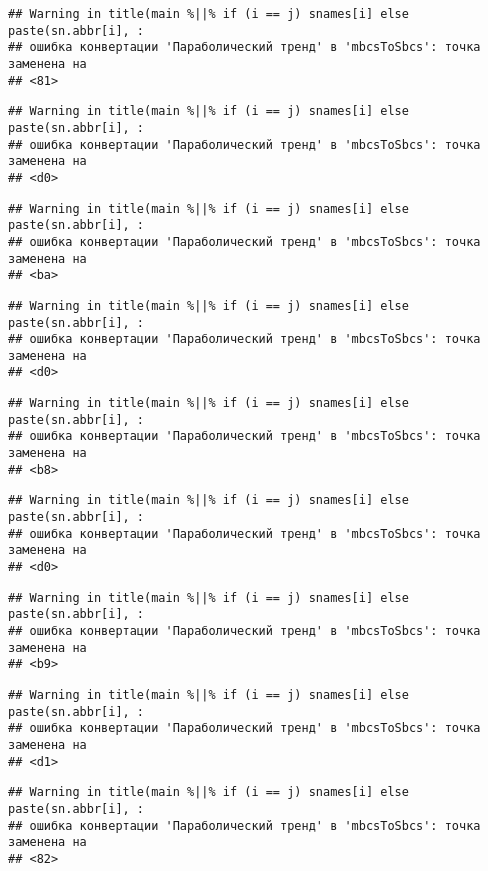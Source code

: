 \documentclass[
]{article}
\begin{document}
\begin{verbatim}
## Warning in title(main %||% if (i == j) snames[i] else paste(sn.abbr[i], :
## ошибка конвертации 'Параболический тренд' в 'mbcsToSbcs': точка заменена на
## <81>
\end{verbatim}

\begin{verbatim}
## Warning in title(main %||% if (i == j) snames[i] else paste(sn.abbr[i], :
## ошибка конвертации 'Параболический тренд' в 'mbcsToSbcs': точка заменена на
## <d0>
\end{verbatim}

\begin{verbatim}
## Warning in title(main %||% if (i == j) snames[i] else paste(sn.abbr[i], :
## ошибка конвертации 'Параболический тренд' в 'mbcsToSbcs': точка заменена на
## <ba>
\end{verbatim}

\begin{verbatim}
## Warning in title(main %||% if (i == j) snames[i] else paste(sn.abbr[i], :
## ошибка конвертации 'Параболический тренд' в 'mbcsToSbcs': точка заменена на
## <d0>
\end{verbatim}

\begin{verbatim}
## Warning in title(main %||% if (i == j) snames[i] else paste(sn.abbr[i], :
## ошибка конвертации 'Параболический тренд' в 'mbcsToSbcs': точка заменена на
## <b8>
\end{verbatim}

\begin{verbatim}
## Warning in title(main %||% if (i == j) snames[i] else paste(sn.abbr[i], :
## ошибка конвертации 'Параболический тренд' в 'mbcsToSbcs': точка заменена на
## <d0>
\end{verbatim}

\begin{verbatim}
## Warning in title(main %||% if (i == j) snames[i] else paste(sn.abbr[i], :
## ошибка конвертации 'Параболический тренд' в 'mbcsToSbcs': точка заменена на
## <b9>
\end{verbatim}

\begin{verbatim}
## Warning in title(main %||% if (i == j) snames[i] else paste(sn.abbr[i], :
## ошибка конвертации 'Параболический тренд' в 'mbcsToSbcs': точка заменена на
## <d1>
\end{verbatim}

\begin{verbatim}
## Warning in title(main %||% if (i == j) snames[i] else paste(sn.abbr[i], :
## ошибка конвертации 'Параболический тренд' в 'mbcsToSbcs': точка заменена на
## <82>
\end{verbatim}
\end{document}
